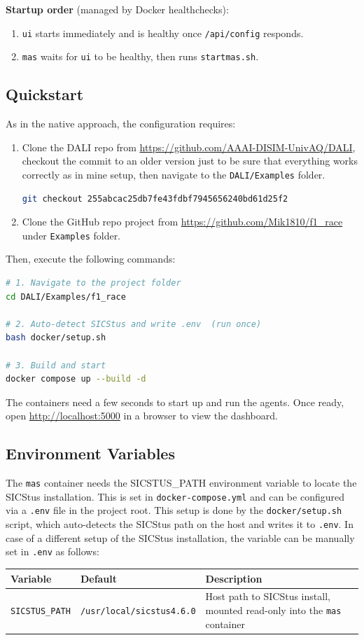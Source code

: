 \noindent
\textbf{Startup order} (managed by Docker healthchecks):
\begin{enumerate}[leftmargin=2em]
  \item \texttt{ui} starts immediately and is healthy once \texttt{/api/config} responds.
  \item \texttt{mas} waits for \texttt{ui} to be healthy, then runs \texttt{startmas.sh}.
\end{enumerate}

\subsection{Quickstart}
As in the native approach, the configuration requires:
\begin{enumerate}
  \item Clone the DALI repo from \url{https://github.com/AAAI-DISIM-UnivAQ/DALI}, 
  checkout the commit to an older version just to be sure that everything works 
  correctly as in mine setup, then navigate to the \texttt{DALI/Examples} folder.
  \begin{lstlisting}[language=bash, numbers=none]
  git checkout 255abcac25db7fe43fdbf7945656240bd61d25f2
  \end{lstlisting}
  \item Clone the GitHub repo project from \url{https://github.com/Mik1810/f1_race} under \texttt{Examples} folder.
\end{enumerate}

Then, execute the following commands:
\begin{lstlisting}[language=bash, numbers=none]
# 1. Navigate to the project folder
cd DALI/Examples/f1_race

# 2. Auto-detect SICStus and write .env  (run once)
bash docker/setup.sh

# 3. Build and start
docker compose up --build -d
\end{lstlisting}

The containers need a few seconds to start up and run the agents. Once ready, open \url{http://localhost:5000} in a browser to view the dashboard.

\subsection{Environment Variables}
The \texttt{mas} container needs the SICSTUS\_PATH environment variable
 to locate the SICStus installation. This is set in 
 \texttt{docker-compose.yml} and can be configured via a 
 \texttt{.env} file in the project root. 
This setup is done by the \texttt{docker/setup.sh} script, 
which auto-detects the SICStus path on the host and writes it 
to \texttt{.env}. In case of a different setup of the SICStus installation, 
the variable can be manually set in \texttt{.env} as follows:

\begin{longtable}{@{} l l p{7cm} @{}}
\toprule
\textbf{Variable} & \textbf{Default} & \textbf{Description} \\
\midrule
\endhead
\texttt{SICSTUS\_PATH} & \texttt{/usr/local/sicstus4.6.0} & Host path to SICStus install, mounted read-only into the \texttt{mas} container \\
\bottomrule
\end{longtable}
